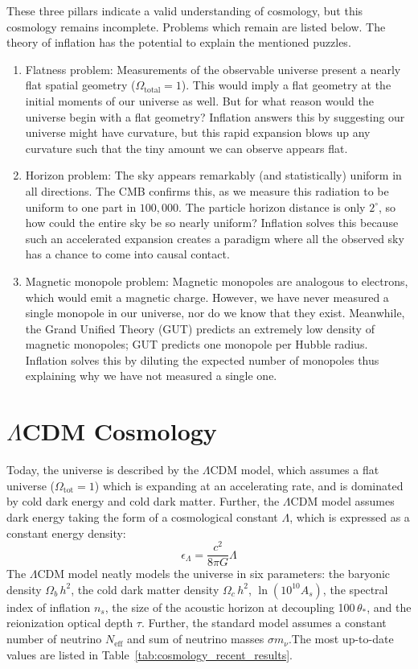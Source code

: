 These three pillars indicate a valid understanding of cosmology, but this cosmology remains incomplete.  Problems which remain are listed below.
The theory of inflation has the potential to explain the mentioned puzzles.

\begin{enumerate}
    \item Flatness problem:  Measurements of the observable universe present a nearly flat spatial geometry ($\Omega_{\text{total}}=1$).  This would imply a flat geometry at the initial moments of our universe as well.  But for what reason would the universe begin with a flat geometry?  Inflation answers this by suggesting our universe might have curvature, but this rapid expansion blows up any curvature such that the tiny amount we can observe appears flat. 
    \item Horizon problem:  The sky appears remarkably (and statistically) uniform in all directions.  The CMB confirms this, as we measure this radiation to be uniform to one part in $100,000$.  The particle horizon distance is only $2^{\circ}$, so how could the entire sky be so nearly uniform?  Inflation solves this because such an accelerated expansion creates a paradigm where all the observed sky has a chance to come into causal contact.
    \item Magnetic monopole problem:  Magnetic monopoles are analogous to electrons, which would emit a magnetic charge.  However, we have never measured a single monopole in our universe, nor do we know that they exist.  Meanwhile, the Grand Unified Theory (GUT) predicts an extremely low density of magnetic monopoles; GUT predicts one monopole per Hubble radius.  Inflation solves this by diluting the expected number of monopoles thus explaining why we have not measured a single one.
\end{enumerate}
\section{$\Lambda$CDM Cosmology}
Today, the universe is described by the $\Lambda$CDM model, which assumes a flat universe ($\Omega_{\text{tot}}=1$) which is expanding at an accelerating rate, and is dominated by cold dark energy and cold dark matter.  Further, the $\Lambda$CDM model assumes dark energy taking the form of a cosmological constant $\Lambda$, which is expressed as a constant energy density:
\begin{equation}
    \epsilon_\Lambda = \frac{c^2}{8\pi G}\Lambda 
\end{equation}
The $\Lambda$CDM model neatly models the universe in six parameters: the baryonic density $\Omega_b\,h^2$, the cold dark matter density $\Omega_c\,h^2$, $\ln(10^{10}A_s)$, the spectral index of inflation $n_s$, the size of the acoustic horizon at decoupling 100\,$\theta_{*}$, and the reionization optical depth $\tau$.  Further, the standard model assumes a constant number of neutrino $N_{\text{eff}}$ and sum of neutrino masses $\sigma m_\nu$.The most up-to-date values are listed in Table~\ref{tab:cosmology_recent_results}.

